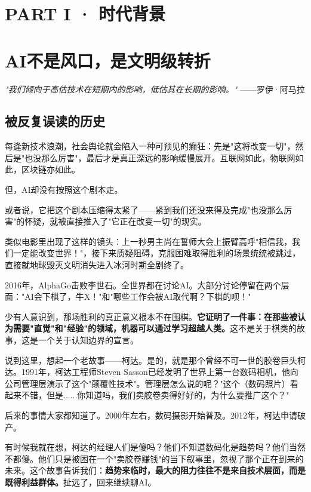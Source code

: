 \chapter{PART I · 时代背景}



\chapter{AI不是风口，是文明级转折}


\textit{"我们倾向于高估技术在短期内的影响，低估其在长期的影响。"}
——罗伊·阿马拉


\section{被反复误读的历史}


每逢新技术浪潮，社会舆论就会陷入一种可预见的癫狂：先是"这将改变一切"，然后是"也没那么厉害"，最后才是真正深远的影响缓慢展开。互联网如此，物联网如此，区块链亦如此。

但，AI却没有按照这个剧本走。

或者说，它把这个剧本压缩得太紧了——紧到我们还没来得及完成"也没那么厉害"的怀疑，就被直接推入了"它正在改变一切"的现实。

类似电影里出现了这样的镜头：上一秒男主尚在誓师大会上振臂高呼"相信我，我们一定能改变世界！"，接下来质疑阻碍，克服困难取得胜利的场景统统被跳过，直接就地球毁灭文明消失进入冰河时期全剧终了。

2016年，AlphaGo击败李世石。全世界都在讨论AI。大部分讨论停留在两个层面："AI会下棋了，牛X！"和"哪些工作会被AI取代啊？下棋的呗！"

少有人意识到，那场胜利的真正意义根本不在围棋。\textbf{它证明了一件事：在那些被认为需要"直觉"和"经验"的领域，机器可以通过学习超越人类。}这不是关于棋类的故事，这是一个关于认知边界的宣言。

说到这里，想起一个老故事——柯达。是的，就是那个曾经不可一世的胶卷巨头柯达。1991年，柯达工程师Steven Sasson已经发明了世界上第一台数码相机，他向公司管理层演示了这个"颠覆性技术"。管理层怎么说的呢？"这个（数码照片）看起来不错，但是......你知道吗，我们卖胶卷卖得好好的，为什么要推广这个？" 

后来的事情大家都知道了。2000年左右，数码摄影开始普及。2012年，柯达申请破产。

有时候我就在想，柯达的经理人们是傻吗？他们不知道数码化是趋势吗？他们当然不都傻。他们只是被困在一个"卖胶卷赚钱"的当下叙事里，忽视了那个正在到来的未来。这个故事告诉我们：\textbf{趋势来临时，最大的阻力往往不是来自技术层面，而是既得利益群体。}扯远了，回来继续聊AI。


